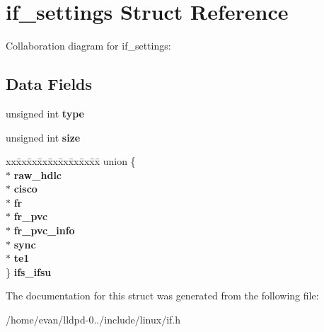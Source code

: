 \section{if\-\_\-settings \-Struct \-Reference}
\label{structif__settings}


\-Collaboration diagram for if\-\_\-settings\-:
\subsection*{\-Data \-Fields}
\begin{DoxyCompactItemize}
\item 
unsigned int {\bfseries type}\label{structif__settings_a4bfea42429249a1f65204f0c0f34704a}

\item 
unsigned int {\bfseries size}\label{structif__settings_aac913b3a1f6ef005d66bf7a84428773e}

\item 
\begin{tabbing}
xx\=xx\=xx\=xx\=xx\=xx\=xx\=xx\=xx\=\kill
union \{\\
 $\ast$ {\bfseries raw\_hdlc}\\
 $\ast$ {\bfseries cisco}\\
 $\ast$ {\bfseries fr}\\
 $\ast$ {\bfseries fr\_pvc}\\
 $\ast$ {\bfseries fr\_pvc\_info}\\
 $\ast$ {\bfseries sync}\\
 $\ast$ {\bfseries te1}\\
\} {\bfseries ifs\_ifsu}\label{structif__settings_a318b5e23e72056a08c281863b1f01d0f}
\\

\end{tabbing}\end{DoxyCompactItemize}


\-The documentation for this struct was generated from the following file\-:\begin{DoxyCompactItemize}
\item 
/home/evan/lldpd-\/0../include/linux/if.\-h\end{DoxyCompactItemize}
